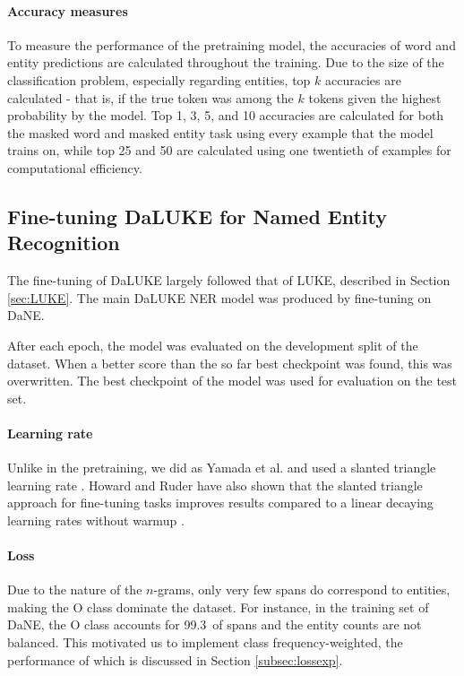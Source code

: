 \documentclass[main.tex]{subfiles}
\begin{document}
\paragraph{Accuracy measures}
To measure the performance of the pretraining model, the accuracies of word and entity predictions are calculated throughout the training.
Due to the size of the classification problem, especially regarding entities, top $ k $ accuracies are calculated - that is, if the true token was among the $ k $ tokens given the highest probability by the model.
Top 1, 3, 5, and 10 accuracies are calculated for both the masked word and masked entity task using every example that the model trains on, while top 25 and 50 are calculated using one twentieth of examples for computational efficiency.

\subsection{Fine-tuning DaLUKE for Named Entity Recognition}%
\label{sub:fine-tune-ner}
The fine-tuning of DaLUKE largely followed that of LUKE, described in Section \ref{sec:LUKE}.
The main DaLUKE NER model was produced by fine-tuning on DaNE.

After each epoch, the model was evaluated on the development split of the dataset.
When a better score than the so far best checkpoint was found, this was overwritten.
The best checkpoint of the model was used for evaluation on the test set.

\paragraph{Learning rate}
Unlike in the pretraining, we did as Yamada et al. and used a slanted triangle learning rate \cite{yamada2020luke}.
Howard and Ruder have also shown that the slanted triangle approach for fine-tuning tasks improves results compared to a linear decaying learning rates without warmup \cite{howardruder2018universal}.

\paragraph{Loss}
Due to the nature of the $ n $-grams, only very few spans do correspond to entities, making the O class dominate the dataset.
For instance, in the training set of DaNE, the O class accounts for 99.3\pro\ of spans and the entity counts are not balanced.
This motivated us to implement class frequency-weighted, the performance of which is discussed in Section \ref{subsec:lossexp}.
\end{document}
